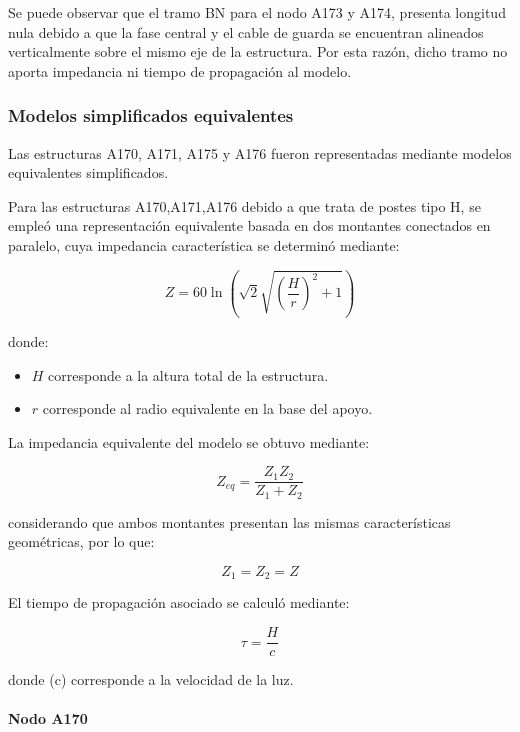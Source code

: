 \documentclass[12pt,letterpaper]{article}
\begin{document}
Se puede observar que el tramo BN para el nodo A173 y A174, presenta longitud nula debido a que la fase central y el cable de guarda se encuentran alineados verticalmente sobre el mismo eje de la estructura. Por esta razón, dicho tramo no aporta impedancia ni tiempo de propagación al modelo.

\subsubsection{Modelos simplificados equivalentes}

Las estructuras A170, A171, A175 y A176 fueron representadas mediante modelos equivalentes simplificados. 

Para las estructuras A170,A171,A176 debido a que trata de postes tipo H, se empleó una representación equivalente basada en dos montantes conectados en paralelo, cuya impedancia característica se determinó mediante:

\begin{equation}
Z=
60\ln
\left(
\sqrt{2}
\sqrt{
\left(
\frac{H}{r}
\right)^2+1
}
\right)
\end{equation}

donde:

\begin{itemize}
\item $H$ corresponde a la altura total de la estructura.
\item $r$ corresponde al radio equivalente en la base del apoyo.
\end{itemize}

La impedancia equivalente del modelo se obtuvo mediante:

\begin{equation}
Z_{eq}=\frac{Z_1 Z_2}
{Z_1+Z_2}
\end{equation}

considerando que ambos montantes presentan las mismas características geométricas, por lo que:

\begin{equation}
Z_1=Z_2=Z
\end{equation}

El tiempo de propagación asociado se calculó mediante:

\begin{equation}
\tau=
\frac{H}{c}
\end{equation}

donde (c) corresponde a la velocidad de la luz.

\paragraph{Nodo A170}
\end{document}
